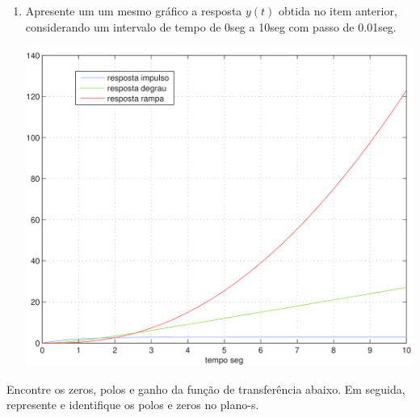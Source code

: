 \documentclass[a4paper, 10pt]{article}
\begin{document}
\begin{list}{\textbf{Questão .}}{
\setlength{\labelwidth}{-2mm} \setlength{\parsep}{0mm}
\setlength{\topsep}{0mm} \setlength{\leftmargin}{0mm}}
\begin{enumerate}
           \begin{equation}
            y(t) = \frac{3 t^2}{2} - 3 t + 3 - 3 e^{-t}
        \end{equation}

            
            
         \item 
             Apresente um um mesmo gráfico a resposta $y(t)$  obtida no item anterior, 
             considerando um intervalo de tempo de 0seg a 10seg com passo de 0.01seg.
 
             \begin{center}
                \includegraphics[scale=0.15]{fig2q.png}
             \end{center}


    \end{enumerate}
    



\newpage

\item
    Encontre os zeros, polos e ganho da função de transferência abaixo. Em seguida, 
    represente e identifique os polos e zeros no plano-s.


\end{list}
\end{document}
